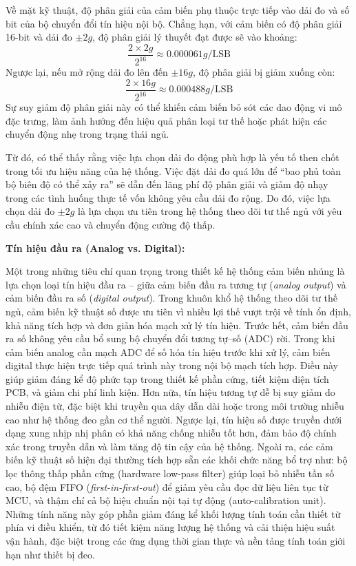 Về mặt kỹ thuật, độ phân giải của cảm biến phụ thuộc trực tiếp 
vào dải đo và số bit của bộ chuyển đổi tín hiệu nội bộ. 
Chẳng hạn, với cảm biến có độ phân giải 16-bit và dải 
đo $\pm2g$, độ phân giải lý thuyết đạt được sẽ vào khoảng:
\[
\frac{2 \times 2g}{2^{16}} \approx 0.000061g/\text{LSB}
\]
Ngược lại, nếu mở rộng dải đo lên đến $\pm16g$, 
độ phân giải bị giảm xuống còn:
\[
\frac{2 \times 16g}{2^{16}} \approx 0.000488g/\text{LSB}
\]
Sự suy giảm độ phân giải này có thể khiến cảm biến bỏ sót các 
dao động vi mô đặc trưng, 
làm ảnh hưởng đến hiệu quả phân loại tư thế hoặc phát hiện 
các chuyển động nhẹ trong trạng thái ngủ.

Từ đó, có thể thấy rằng việc lựa chọn dải đo động phù hợp 
là yếu tố then chốt trong tối ưu hiệu năng của hệ thống. 
Việc đặt dải đo quá lớn để “bao phủ toàn bộ biên độ có thể xảy ra” 
sẽ dẫn đến lãng phí độ phân giải và giảm độ nhạy trong các tình 
huống thực tế vốn không yêu cầu dải đo rộng. 
Do đó, việc lựa chọn dải đo $\pm2g$ là lựa chọn ưu tiên 
trong hệ thống theo dõi tư thế ngủ với yêu cầu chính xác 
cao và chuyển động cường độ thấp.

\textbf{Tín hiệu đầu ra (Analog vs. Digital):} 

Một trong những tiêu chí quan trọng trong thiết kế hệ thống cảm biến 
nhúng là lựa chọn loại tín hiệu đầu ra – giữa cảm biến đầu ra 
tương tự (\textit{analog output}) và cảm biến đầu ra số 
(\textit{digital output}). Trong khuôn khổ hệ thống theo dõi tư 
thế ngủ, cảm biến kỹ thuật số được ưu tiên vì nhiều lợi thế vượt 
trội về tính ổn định, khả năng tích hợp và đơn giản hóa mạch xử 
lý tín hiệu.
Trước hết, cảm biến đầu ra số không yêu cầu bổ sung bộ chuyển 
đổi tương tự–số (ADC) rời. Trong khi cảm biến analog cần mạch 
ADC để số hóa tín hiệu trước khi xử lý, cảm biến digital thực 
hiện trực tiếp quá trình này trong nội bộ mạch tích hợp. 
Điều này giúp giảm đáng kể độ phức tạp trong thiết kế phần cứng, 
tiết kiệm diện tích PCB, và giảm chi phí linh kiện.
Hơn nữa, tín hiệu tương tự dễ bị suy giảm do nhiễu điện từ, 
đặc biệt khi truyền qua dây dẫn dài hoặc trong môi trường nhiễu 
cao như hệ thống đeo gần cơ thể người. Ngược lại, 
tín hiệu số được truyền dưới dạng xung nhịp nhị phân có khả 
năng chống nhiễu tốt hơn, đảm bảo độ chính xác trong truyền 
dẫn và làm tăng độ tin cậy của hệ thống.
Ngoài ra, các cảm biến kỹ thuật số hiện đại thường tích hợp sẵn 
các khối chức năng bổ trợ như: bộ lọc thông thấp phần cứng 
(hardware low-pass filter) giúp loại bỏ nhiễu tần số cao, 
bộ đệm FIFO (\textit{first-in-first-out}) để giảm yêu cầu đọc 
dữ liệu liên tục từ MCU, và thậm chí cả bộ hiệu chuẩn nội tại 
tự động (auto-calibration unit). 
Những tính năng này góp phần giảm đáng kể khối lượng tính 
toán cần thiết từ phía vi điều khiển, từ đó tiết kiệm năng 
lượng hệ thống và cải thiện hiệu suất vận hành, đặc biệt trong 
các ứng dụng thời gian thực và nền tảng tính toán giới hạn như 
thiết bị đeo.



